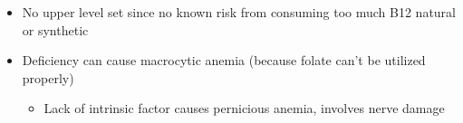 \documentclass[12pt]{article}
\begin{document}
\begin{itemize}
                    \begin{itemize}
                        \item No upper level set since no known risk from consuming too much B12 natural or synthetic
                        \item Deficiency can cause macrocytic anemia (because folate can't be utilized properly)
                            \begin{itemize}
                                \item Lack of intrinsic factor causes pernicious anemia, involves nerve damage
                            \end{itemize}
                    \end{itemize}
            \end{itemize}
\end{document}
